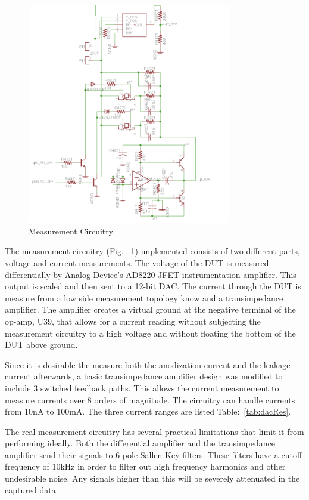\documentclass[journal]{IEEEtran}
\begin{document}
            \begin{figure}[here]
            \centering
            \includegraphics[width=3.5in]{measCir}
            \caption{Measurement Circuitry}
            \label{fig:measCir}
            \end{figure}

            The measurement circuitry (Fig. ~\ref{fig:measCir}) implemented consists of two different parts, voltage and current measurements. The voltage of the DUT is measured differentially by Analog Device’s AD8220 JFET instrumentation amplifier. This output is scaled and then sent to a 12-bit DAC. The current through the DUT is measure from a low side measurement topology know and a transimpedance amplifier. The amplifier creates a virtual ground at the negative terminal of the op-amp, U39, that allows for a current reading without subjecting the measurement circuitry to a high voltage and without floating the bottom of the DUT above ground.

            Since it is desirable the measure both the anodization current and the leakage current afterwards, a basic transimpedance amplifier design was modified to include 3 switched feedback paths. This allows the current measurement to measure currents over 8 orders of magnitude. The circuitry can handle currents from 10nA to 100mA. The three current ranges are listed Table:~\ref{tab:dacRes}.

            The real measurement circuitry has several practical limitations that limit it from performing ideally. Both the differential amplifier and the transimpedance amplifier send their signals to 6-pole Sallen-Key filters. These filters have a cutoff frequency of 10kHz \cite{sThesis} in order to filter out high frequency harmonics and other undesirable noise. Any signals higher than this will be severely attenuated in the captured data.
\end{document}
